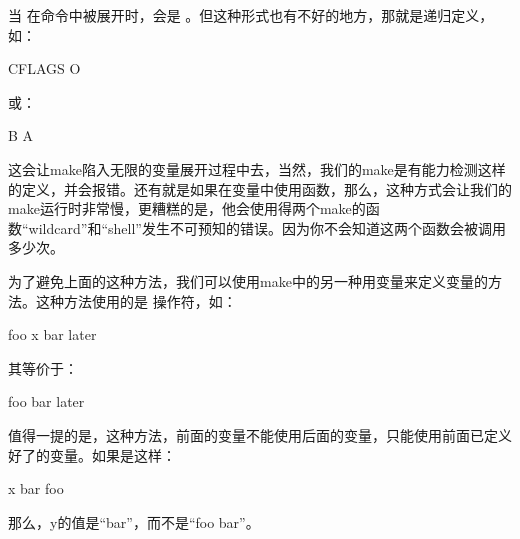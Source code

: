 \documentclass[a4paper,10pt]{sphinxmanual}
\begin{document}
当  在命令中被展开时，会是  。但这种形式也有不好的地方，那就是递归定义，如：

\begin{sphinxVerbatim}[commandchars=\\\{\}]
  CFLAGS \PYGZhy{}O
\end{sphinxVerbatim}

或：

\begin{sphinxVerbatim}[commandchars=\\\{\}]
  B
  A
\end{sphinxVerbatim}

这会让make陷入无限的变量展开过程中去，当然，我们的make是有能力检测这样的定义，并会报错。还有就是如果在变量中使用函数，那么，这种方式会让我们的make运行时非常慢，更糟糕的是，他会使用得两个make的函数“wildcard”和“shell”发生不可预知的错误。因为你不会知道这两个函数会被调用多少次。

为了避免上面的这种方法，我们可以使用make中的另一种用变量来定义变量的方法。这种方法使用的是 \sphinxcode{\sphinxupquote{:=}} 操作符，如：

\begin{sphinxVerbatim}[commandchars=\\\{\}]
  foo
  x bar
  later
\end{sphinxVerbatim}

其等价于：

\begin{sphinxVerbatim}[commandchars=\\\{\}]
  foo bar
  later
\end{sphinxVerbatim}

值得一提的是，这种方法，前面的变量不能使用后面的变量，只能使用前面已定义好了的变量。如果是这样：

\begin{sphinxVerbatim}[commandchars=\\\{\}]
  x bar
  foo
\end{sphinxVerbatim}

那么，y的值是“bar”，而不是“foo bar”。
\end{document}
